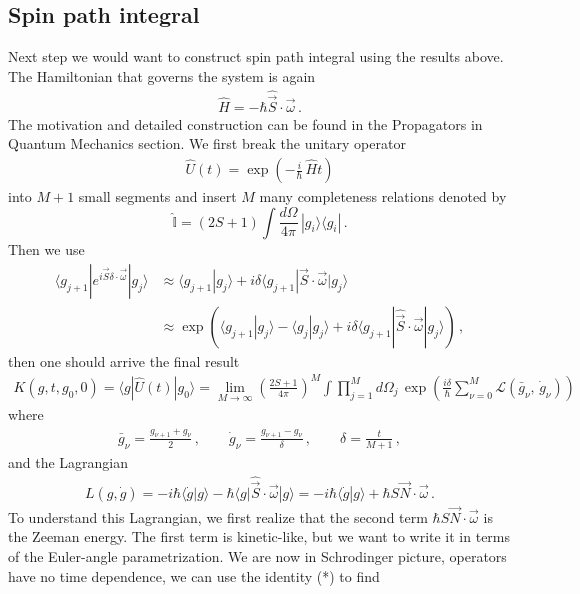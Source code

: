 \documentclass[11pt, onesided]{book}
\theoremstyle{break}
\theoremstyle{break}
\begin{document}
\subsection{Spin path integral}
Next step we would want to construct spin path integral using the results above. The Hamiltonian that governs the system is again
\begin{align*}
\hat{H} = -\hbar \hat{\vec{S}}\cdot \vec{\omega}\,.
\end{align*}
The motivation and detailed construction can be found in the Propagators in Quantum Mechanics section. We first break the unitary operator
\begin{align*}
\hat{U}(t) = \exp\left( -\frac{i}{\hbar}\, \hat{H}t\right)
\end{align*}
into $M+1$ small segments and insert $M$ many completeness relations denoted by 
$$\hat{\mathbb{I}} = (2S+1) \int \frac{d\Omega}{4\pi} \, |g_i\rangle\langle g_i|\,.$$ Then we use
\begin{align*}
\langle g_{j+1} | e^{i\hat{\vec{S}}\delta\cdot\vec{\omega}}|g_j \rangle &\approx \langle g_{j+1}|g_j\rangle + i \delta \langle g_{j+1} |\hat{\vec{S}}\cdot \vec{\omega}|g_j\rangle \\
&\approx \exp\left(
\langle g_{j+1}|g_j\rangle - \langle g_j |g_j\rangle + i\delta\langle g_{j+1} |\hat{\vec{S}}\cdot \vec{\omega}|g_j\rangle
\right)\,,
\end{align*}
then one should arrive the final result
\begin{align*}
K(g,t,g_0,0) = \langle g |\hat{U}(t) |g_0\rangle = \lim_{M\to \infty}\left(\frac{2S+1}{4\pi}\right)^M \int \prod_{j=1}^{M}d\Omega_j \, \exp\left(
\frac{i\delta}{\hbar}\sum_{\nu=0}^M \mathcal{L}(\bar{g}_\nu, \, \dot{g}_\nu)
\right)
\end{align*}
where 
\begin{align*}
\bar{g}_\nu = \frac{g_{\nu+1}+g_\nu}{2}\,,\qquad
\dot{g}_\nu = \frac{g_{\nu+1} - g_\nu}{\delta}\,,\qquad
\delta = \frac{t}{M+1}\,,
\end{align*}
and the Lagrangian
\begin{align*}
L(g,\dot{g}) = -i\hbar\langle \dot{g}|g\rangle - \hbar\langle g|\hat{\vec{S}}\cdot \vec{\omega}|g\rangle = -i\hbar\langle \dot{g}|g\rangle + \hbar S\vec{N}\cdot \vec{\omega}\,.
\end{align*}
To understand this Lagrangian, we first realize that the second term $\hbar S\vec{N}\cdot \vec{\omega}$ is the Zeeman energy. The first term is kinetic-like, but we want to write it in terms of the Euler-angle parametrization. We are now in Schrodinger picture, operators have no time dependence, we can use the identity (*) to find
\end{document}
